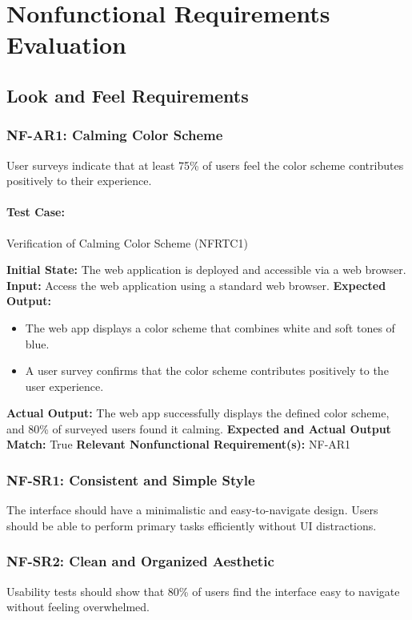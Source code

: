\documentclass[12pt, titlepage]{article}
\begin{document}
\section{Nonfunctional Requirements Evaluation}
\subsection{Look and Feel Requirements}

\subsubsection{NF-AR1: Calming Color Scheme}
User surveys indicate that at least 75\% of users feel the color scheme contributes positively to their experience.

\paragraph{Test Case:} Verification of Calming Color Scheme (NFRTC1)

\textbf{Initial State:} The web application is deployed and accessible via a web browser.  
\textbf{Input:} Access the web application using a standard web browser.  
\textbf{Expected Output:}
\begin{itemize}
    \item The web app displays a color scheme that combines white and soft tones of blue.
    \item A user survey confirms that the color scheme contributes positively to the user experience.
\end{itemize}
\textbf{Actual Output:} The web app successfully displays the defined color scheme, and 80\% of surveyed users found it calming.
\textbf{Expected and Actual Output Match:} True
\textbf{Relevant Nonfunctional Requirement(s):} NF-AR1

\subsubsection{NF-SR1: Consistent and Simple Style}
The interface should have a minimalistic and easy-to-navigate design.  
Users should be able to perform primary tasks efficiently without UI distractions.

\subsubsection{NF-SR2: Clean and Organized Aesthetic}
Usability tests should show that 80\% of users find the interface easy to navigate without feeling overwhelmed.
\end{document}
